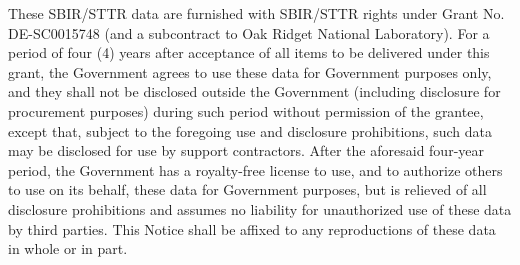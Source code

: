 



These SBIR/STTR data are furnished with SBIR/STTR rights under Grant
No. DE-SC0015748 (and a subcontract to Oak Ridget National Laboratory).
For a period of four (4) years after acceptance of all items to be
delivered under this grant, the Government agrees to use these data
for Government purposes only, and they shall not be disclosed outside
the Government (including disclosure for procurement purposes) during
such period without permission of the grantee, except that, subject to
the foregoing use and disclosure prohibitions, such data may be
disclosed for use by support contractors.  After the aforesaid
four-year period, the Government has a royalty-free license to use,
and to authorize others to use on its behalf, these data for
Government purposes, but is relieved of all disclosure prohibitions
and assumes no liability for unauthorized use of these data by third
parties.  This Notice shall be affixed to any reproductions of these
data in whole or in part.

